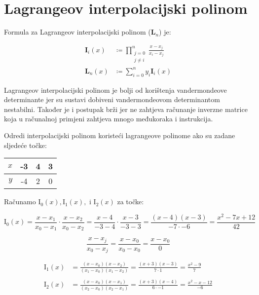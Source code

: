 \section{Lagrangeov interpolacijski polinom}

Formula za Lagrangeov interpolacijski polinom (${\mathbf L}_n$) je:

\begin{align}
    {\mathbf I}_i(x) &\coloneq \prod_{\substack{j=0\\j\neq i}}^{n} \frac{x-x_j}{x_i-x_j}\\
    {\mathbf L}_n(x) &\coloneq \sum_{i=0}^{n} y_i\mathbf{I}_i(x)
\end{align}

Lagrangeov interpolacijski polinom je bolji od korištenja vandermondeove determinante jer su sustavi dobiveni vandermondeovom determinantom nestabilni.
Također je i postupak brži jer ne zahtjeva računanje inverzne matrice koja u računalnoj primjeni zahtjeva mnogo međukoraka i instrukcija.

\begin{examplebox}
    Odredi interpolacijski polinom koristeći lagrangeove polinome ako su zadane sljedeće točke:

    \center
    \begin{tabular}{r|c|c|c}
        $x$&-3&4&3\\
        \hline
        $y$&-4&2&0\\
    \end{tabular}
\end{examplebox}

Računamo $\mathrm{I}_0(x), \mathrm{I}_1(x),$ i $\mathrm{I}_2(x)$ za točke:

$$
\mathrm{I}_0(x) = \frac{x-x_1}{x_0-x_1} \cdot \frac{x-x_2}{x_0-x_2} = \frac{x-4}{-3-4} \cdot \frac{x-3}{-3-3} = \frac{(x-4)(x-3)}{-7\cdot-6} = \frac{x^2-7x+12}{42}
$$

\begin{warningbox}
    $$
    \frac{x-x_j}{x_0-x_j}=\frac{x-x_0}{x_0-x_0}=\frac{x-x_0}{0}
    $$
\end{warningbox}

\begin{align*}
\mathrm{I}_1(x) &= \frac{(x-x_0)(x-x_2)}{(x_1-x_0)(x_1-x_2)} = \frac{(x+3)(x-3)}{7\cdot1} = \frac{x^2-9}{7}\\\\
\mathrm{I}_2(x) &= \frac{(x-x_0)(x-x_1)}{(x_2-x_0)(x_2-x_1)} = \frac{(x+3)(x-4)}{6\cdot-1} = \frac{x^2-x-12}{-6}
\end{align*}

